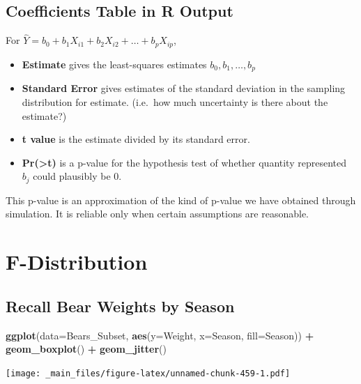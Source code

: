 \documentclass[]{book}
\newenvironment{Shaded}{\begin{snugshade}}{\end{snugshade}}
\newcommand{\KeywordTok}[1]{\textcolor[rgb]{0.13,0.29,0.53}{\textbf{#1}}}
\newcommand{\DataTypeTok}[1]{\textcolor[rgb]{0.13,0.29,0.53}{#1}}
\newcommand{\StringTok}[1]{\textcolor[rgb]{0.31,0.60,0.02}{#1}}
\newcommand{\OperatorTok}[1]{\textcolor[rgb]{0.81,0.36,0.00}{\textbf{#1}}}
\newcommand{\NormalTok}[1]{#1}
\begin{document}
\subsection{Coefficients Table in R
Output}\label{coefficients-table-in-r-output}

For \(\hat{Y} = b_0 + b_1 X_{i1} + b_2X_{i2}+ \ldots + b_pX_{ip}\),

\begin{itemize}
\item
  \textbf{Estimate} gives the least-squares estimates
  \(b_0, b_1, \ldots, b_p\)
\item
  \textbf{Standard Error} gives estimates of the standard deviation in
  the sampling distribution for estimate. (i.e.~how much uncertainty is
  there about the estimate?)
\item
  \textbf{t value} is the estimate divided by its standard error.
\item
  \textbf{Pr(\textgreater{}\textbar{}t\textbar{})} is a p-value for the
  hypothesis test of whether quantity represented \(b_j\) could
  plausibly be 0.
\end{itemize}

This p-value is an approximation of the kind of p-value we have obtained
through simulation. It is reliable only when certain assumptions are
reasonable.

\section{F-Distribution}\label{f-distribution}

\subsection{Recall Bear Weights by
Season}\label{recall-bear-weights-by-season}

\begin{Shaded}
\begin{Highlighting}[]
\KeywordTok{ggplot}\NormalTok{(}\DataTypeTok{data=}\NormalTok{Bears_Subset, }\KeywordTok{aes}\NormalTok{(}\DataTypeTok{y=}\NormalTok{Weight, }\DataTypeTok{x=}\NormalTok{Season, }\DataTypeTok{fill=}\NormalTok{Season)) }\OperatorTok{+}\StringTok{ }
\StringTok{   }\KeywordTok{geom_boxplot}\NormalTok{() }\OperatorTok{+}\StringTok{ }\KeywordTok{geom_jitter}\NormalTok{()}
\end{Highlighting}
\end{Shaded}

\texttt{[image: \_main\_files/figure-latex/unnamed-chunk-459-1.pdf]}
\end{document}

